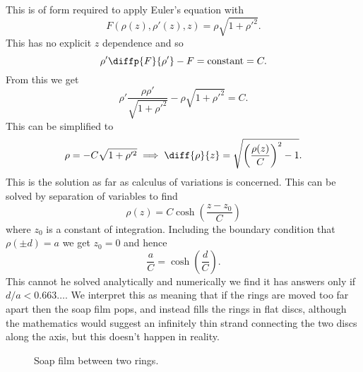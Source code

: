 \documentclass[fleqn]{NotesClass}
\begin{document}
    This is of form required to apply Euler's equation with
    \begin{equation}
        F(\rho(z), \rho'(z), z) = \rho\sqrt{1 + \rho'^2}.
    \end{equation}
    This has no explicit \(z\) dependence and so
    \begin{equation}
        \rho'\diffp{F}{\rho'} - F = \text{constant} = C.
    \end{equation}
    From this we get
    \begin{equation}
        \rho' \frac{\rho \rho'}{\sqrt{1 + \rho'^2}} - \rho\sqrt{1 + \rho'^2} = C.
    \end{equation}
    This can be simplified to
    \begin{equation}
        \rho = -C\sqrt{1 + \rho'^2} \implies \diff{\rho}{z} = \sqrt{\left( \frac{\rho(z)}{C} \right)^2 - 1}.
    \end{equation}
    This is the solution as far as calculus of variations is concerned.
    This can be solved by separation of variables to find
    \begin{equation}
        \rho(z) = C\cosh\left( \frac{z - z_0}{C} \right)
    \end{equation}
    where \(z_0\) is a constant of integration.
    Including the boundary condition that \(\rho(\pm d) = a\) we get \(z_0 = 0\) and hence
    \begin{equation}
        \frac{a}{C} = \cosh\left( \frac{d}{C} \right).
    \end{equation}
    This cannot he solved analytically and numerically we find it has answers only if \(d/a < 0.663\dots\).
    We interpret this as meaning that if the rings are moved too far apart then the soap film pops, and instead fills the rings in flat discs, although the mathematics would suggest an infinitely thin strand connecting the two discs along the axis, but this doesn't happen in reality.
    
    \begin{figure}
        \caption{Soap film between two rings.}
    \end{figure}
    
\end{document}
